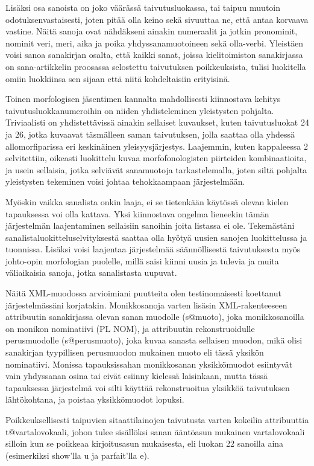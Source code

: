 \documentclass[free]{flammie}
\begin{document}
Lisäksi osa sanoista on joko väärässä taivutusluokassa, tai taipuu muutoin odotuksenvastaisesti, joten pitää olla keino sekä sivuuttaa ne, että antaa korvaava vastine. Näitä sanoja ovat nähdäkseni ainakin numeraalit ja jotkin pronominit, nominit veri, meri, aika ja poika yhdyssanamuotoineen sekä olla-verbi. Yleistäen
voisi sanoa sanakirjan osalta, että kaikki sanat, joissa kielitoimiston sanakirjassa
on sana-artikkelin proosassa selostettu taivutuksen poikkeuksista, tulisi luokitella
omiin luokkiinsa sen sijaan että niitä kohdeltaisiin erityisinä.

Toinen morfologisen jäsentimen kannalta mahdollisesti kiinnostava kehitys taivutusluokkanumeroihin on niiden yhdisteleminen yleistysten pohjalta. Triviaalisti
on yhdistettävissä ainakin sellaiset kuvaukset, kuten taivutusluokat 24 ja 26, jotka
kuvaavat täsmälleen saman taivutuksen, jolla saattaa olla yhdessä allomorfiparissa
eri keskinäinen yleisyysjärjestys. Laajemmin, kuten kappaleessa 2 selvitettiin, oikeasti luokittelu kuvaa morfofonologisten piirteiden kombinaatioita, ja usein sellaisia, jotka selviävät sanamuotoja tarkastelemalla, joten siltä pohjalta yleistysten
tekeminen voisi johtaa tehokkaampaan järjestelmään.

Myöskin vaikka sanalista onkin laaja, ei se tietenkään käytössä olevan kielen tapauksessa voi olla kattava. Yksi kiinnostava ongelma lieneekin tämän järjestelmän
laajentaminen sellaisiin sanoihin joita listassa ei ole. Tekemästäni sanalistaluokitteluselvityksestä saattaa olla hyötyä uusien sanojen luokittelussa ja tuonnissa.
Lisäksi voisi laajentaa järjestelmää säännöllisestä taivutuksesta myös johto-opin
morfologian puolelle, millä saisi kiinni uusia ja tulevia ja muita väliaikaisia sanoja, jotka sanalistasta uupuvat.

Näitä XML-muodossa arvioimiani puutteita olen testinomaisesti koettanut järjestelmässäni korjatakin. Monikkosanoja varten lisäsin XML-rakenteeseen attribuutin sanakirjassa olevan sanan muodolle (s@muoto), joka monikkosanoilla on
monikon nominatiivi (PL NOM), ja attribuutin rekonstruoidulle perusmuodolle
(s@perusmuoto), joka kuvaa sanasta sellaisen muodon, mikä olisi sanakirjan
tyypillisen perusmuodon mukainen muoto eli tässä yksikön nominatiivi. Monissa
tapauksissahan monikkosanan yksikkömuodot esiintyvät vain yhdyssanan osina
tai eivät esiinny kielessä laisinkaan, mutta tässä tapauksessa järjestelmä voi silti
käyttää rekonstruoitua yksikköä taivutuksen lähtökohtana, ja poistaa yksikkömuodot lopuksi.

Poikkeuksellisesti taipuvien sitaattilainojen taivutusta varten kokeilin attribuuttia
t@vartalovokaali, johon tulee sisällöksi sanan ääntöasun mukainen vartalovokaali silloin kun se poikkeaa kirjoitusasun mukaisesta, eli luokan 22 sanoilla
aina (esimerkiksi show’lla u ja parfait’lla e).
\end{document}
